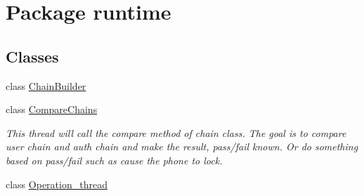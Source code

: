 \hypertarget{namespaceruntime}{}\section{Package runtime}
\label{namespaceruntime}
\subsection*{Classes}
\begin{DoxyCompactItemize}
\item 
class \hyperlink{classruntime_1_1_chain_builder}{Chain\+Builder}
\item 
class \hyperlink{classruntime_1_1_compare_chains}{Compare\+Chains}
\begin{DoxyCompactList}\small\item\em This thread will call the compare method of chain class. The goal is to compare user chain and auth chain and make the result, pass/fail known. Or do something based on pass/fail such as cause the phone to lock. \end{DoxyCompactList}\item 
class \hyperlink{classruntime_1_1_operation__thread}{Operation\+\_\+thread}
\end{DoxyCompactItemize}
